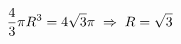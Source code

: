 \documentclass[preview]{standalone}
\begin{document}
\begin{align*}
\special{dvisvgm:raw <g id='unique000'>}\frac{4}{3}\pi R^3=4\sqrt{3}\pi \;\Rightarrow\; R=\sqrt{3}\special{dvisvgm:raw </g>}
\end{align*}
\end{document}
